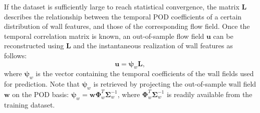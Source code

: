 If the dataset is sufficiently large to reach statistical convergence, the matrix $\mathbf{L}$ describes the relationship between the temporal POD coefficients of a certain distribution of wall features, and those of the corresponding flow field.
Once the temporal correlation matrix is known, an out-of-sample flow field $\mathbf{u}$ can be reconstructed using $\mathbf{L}$ and the instantaneous realization of wall features as follows:
\begin{equation}
    \mathbf{u}=\boldsymbol{\psi}_{w}\mathbf{L},
    \label{epod02}
\end{equation}
\noindent where $\boldsymbol{\psi}_{w}$ is the vector containing the temporal coefficients of the wall fields used for prediction.
Note that $\boldsymbol{\psi}_{w}$ is retrieved by projecting the out-of-sample wall field $\boldsymbol{w}$ on the POD basis: $\boldsymbol{\psi}_{w}=\boldsymbol{w}\boldsymbol{\Phi}_{w}^T \boldsymbol{\Sigma}_{w}^{-1}$, where $\boldsymbol{\Phi}_{w}^T \boldsymbol{\Sigma}_{w}^{-1}$ is readily available from the training dataset.

